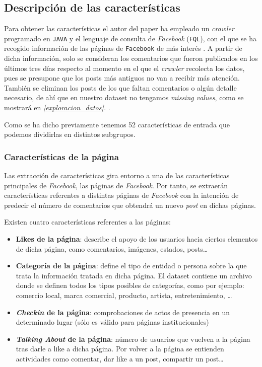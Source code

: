 \documentclass[11pt]{article}
\begin{document}
\subsection{Descripción de las características}

Para obtener las características el autor del paper \cite{original_paper:paper} ha empleado un \emph{crawler} programado en \lstinline{JAVA} y el lenguaje de consulta de \emph{Facebook} (\lstinline{FQL}), con el que se ha recogido información de las páginas de \lstinline{Facebook} de más interés \cite{original_paper:paper}. A partir de dicha información, solo se consideran los comentarios que fueron publicados en los últimos tres días respecto al momento en el que el \emph{crawler} recolecta los datos, pues se presupone que los posts más antiguos no van a recibir más atención. También se eliminan los posts de los que faltan comentarios o algún detalle necesario, de ahí que en nuestro dataset no tengamos \emph{missing values}, como se mostrará en \emph{\ref{exploracion_datos}. }.

Como se ha dicho previamente tenemos 52 características de entrada que podemos dividirlas en distintos subgrupos.

\subsubsection{Características de la página}

Las extracción de características gira entorno a una de las características principales de \emph{Facebook}, las páginas de \emph{Facebook}. Por tanto, se extraerán características referentes a distintas páginas de \emph{Facebook} con la intención de predecir el número de comentarios que obtendrá un nuevo \emph{post} en dichas páginas.

Existen cuatro características referentes a las páginas:

\begin{itemize}
  \item \textbf{Likes de la página}: describe el apoyo de los usuarios hacia ciertos elementos de dicha página, como comentarios, imágenes, estados, posts\ldots

  \item \textbf{Categoría de la página}: define el tipo de entidad o persona sobre la que trata la información tratada en dicha página. El dataset contiene un archivo donde se definen todos los tipos posibles de categorías, como por ejemplo: comercio local, marca comercial, producto, artista, entretenimiento, \ldots

  \item \textbf{\emph{Checkin} de la página}: comprobaciones de actos de presencia en un determinado lugar (sólo es válido para páginas institucionales)

  \item \textbf{\emph{Talking About} de la página}: número de usuarios que vuelven a la página tras darle a like a dicha página. Por volver a la página se entienden actividades como comentar, dar like a un post, compartir un post\ldots
\end{itemize}
\end{document}
